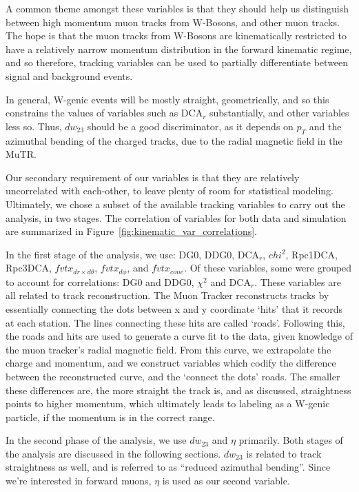 A common theme amongst these variables is that they should help us distinguish
between high momentum muon tracks from W-Bosons, and other muon tracks. The hope
is that the muon tracks from W-Bosons are kinematically restricted to have a
relatively narrow momentum distribution in the forward kinematic regime, and so
therefore, tracking variables can be used to partially differentiate between
signal and background events.

In general, W-genic events will be mostly straight, geometrically, and so this
constrains the values of variables such as DCA${}_r$ substantially, and other
variables less so. Thus, $dw_{23}$ should be a good discriminator, as it depends
on $p_T$ and the azimuthal bending of the charged tracks, due to the radial
magnetic field in the MuTR.

Our secondary requirement of our variables is that they are relatively
uncorrelated with each-other, to leave plenty of room for statistical modeling.
Ultimately, we chose a subset of the available tracking variables to carry out
the analysis, in two stages. The correlation of variables for both data and
simulation are summarized in Figure~\ref{fig:kinematic_var_correlations}.

In the first stage of the analysis, we use: DG0, DDG0, DCA${}_r$, $chi^2$,
Rpc1DCA, Rpc3DCA, $fvtx_{dr \times d\theta}$, $fvtx_{d\phi}$, and $fvtx_{cone}$.
Of these variables, some were grouped to account for correlations: DG0 and DDG0,
$\chi^2$ and DCA${}_r$. These variables are all related to track reconstruction.
The Muon Tracker reconstructs tracks by essentially connecting the dots between
x and y coordinate `hits' that it records at each station. The lines connecting
these hits are called `roads'. Following this, the roads and hits are used to
generate a curve fit to the data, given knowledge of the muon tracker's radial
magnetic field. From this curve, we extrapolate the charge and momentum, and we
construct variables which codify the difference between the reconstructed curve,
and the `connect the dots' roads. The smaller these differences are, the more
straight the track is, and as discussed, straightness points to higher momentum,
which ultimately leads to labeling as a W-genic particle, if the momentum is in
the correct range.

In the second phase of the analysis, we use $dw_{23}$ and $\eta$ primarily. Both
stages of the analysis are discussed in the following sections. $dw_{23}$ is
related to track straightness as well, and is referred to as ``reduced azimuthal
bending''. Since we're interested in forward muons, $\eta$ is used as our second
variable.

